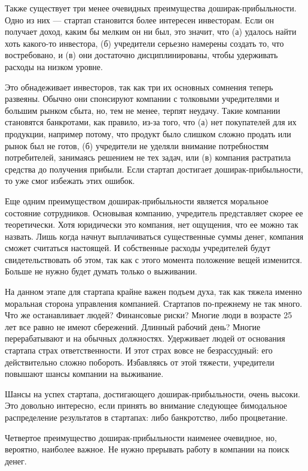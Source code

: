 \documentclass[ebook,12pt,oneside,openany]{memoir}
\begin{document}
Также существует три менее очевидных преимущества
доширак-прибыльности. Одно из них — стартап становится более интересен
инвесторам. Если он получает доход, каким бы мелким он ни был, это
значит, что (а) удалось найти хоть какого-то инвестора, (б) учредители
серьезно намерены создать то, что востребовано, и (в) они достаточно
дисциплинированы, чтобы удерживать расходы на низком уровне.

Это обнадеживает инвесторов, так как три их основных сомнения теперь
развеяны. Обычно они спонсируют компании с толковыми учредителями и
большим рынком сбыта, но, тем не менее, терпят неудачу. Такие компании
становятся банкротами, как правило, из-за того, что (а) нет
покупателей для их продукции, например потому, что продукт было
слишком сложно продать или рынок был не готов, (б) учредители не
уделяли внимание потребностям потребителей, занимаясь решением не тех
задач, или (в) компания растратила средства до получения прибыли. Если
стартап достигает доширак-прибыльности, то уже смог избежать этих
ошибок.

Еще одним преимуществом доширак-прибыльности является моральное
состояние сотрудников. Основывая компанию, учредитель представляет
скорее ее теоретически. Хотя юридически это компания, нет ощущения,
что ее можно так назвать. Лишь когда начнут выплачиваться существенные
суммы денег, компания сможет считаться настоящей. И собственные
расходы учредителей будут свидетельствовать об этом, так как с этого
момента положение вещей изменится. Больше не нужно будет думать только
о выживании.

На данном этапе для стартапа крайне важен подъем духа, так как тяжела
именно моральная сторона управления компанией. Стартапов по-прежнему
не так много. Что же останавливает людей? Финансовые риски? Многие
люди в возрасте 25 лет все равно не имеют сбережений. Длинный рабочий
день? Многие перерабатывают и на обычных должностях. Удерживает людей
от основания стартапа страх ответственности. И этот страх вовсе не
безрассудный: его действительно сложно побороть. Избавляясь от этой
тяжести, учредители повышают шансы компании на выживание.

Шансы на успех стартапа, достигающего доширак-прибыльности, очень
высоки. Это довольно интересно, если принять во внимание следующее
бимодальное распределение результатов в стартапах: либо банкротство,
либо процветание.

Четвертое преимущество доширак-прибыльности наименее очевидное, но,
вероятно, наиболее важное. Не нужно прерывать работу в компании на
поиск денег.
\end{document}
